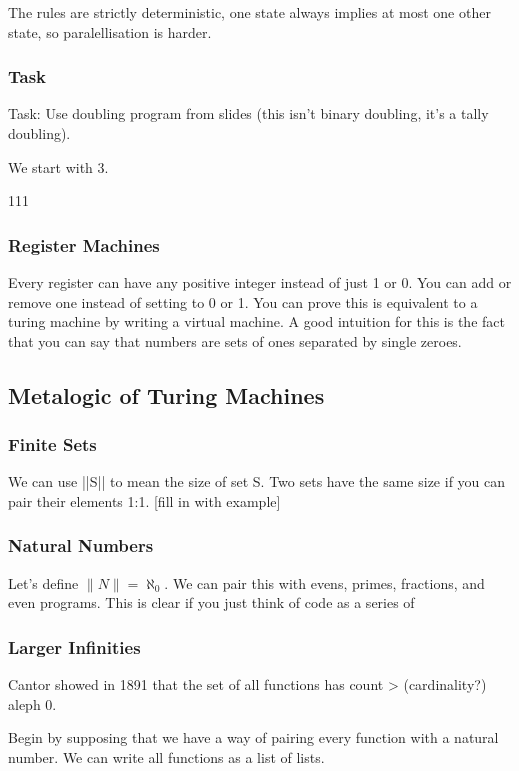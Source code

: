 \documentclass{article}
\begin{document}
The rules are strictly deterministic, one state always implies at most one other state, so paralellisation is harder.

\subsubsection{Task}
Task:
Use doubling program from slides (this isn't binary doubling, it's a tally doubling).

We start with 3.

111

\subsubsection{Register Machines}
Every register can have any positive integer instead of just 1 or 0.
You can add or remove one instead of setting to 0 or 1.
You can prove this is equivalent to a turing machine by writing a virtual machine.
A good intuition for this is the fact that you can say that numbers are sets of ones separated by single zeroes.

\subsection{Metalogic of Turing Machines}
\subsubsection{Finite Sets}
We can use ||S|| to mean the size of set S.
Two sets have the same size if you can pair their elements 1:1.
[fill in with example]

\subsubsection{Natural Numbers}
Let's define $\lVert N \rVert = \aleph_0$.
We can pair this with evens, primes, fractions, and even programs.
This is clear if you just think of code as a series of 

\subsubsection{Larger Infinities}
Cantor showed in 1891 that the set of all functions has count > (cardinality?) aleph 0.

Begin by supposing that we have a way of pairing every function with a natural number.
We can write all functions as a list of lists.
\end{document}
